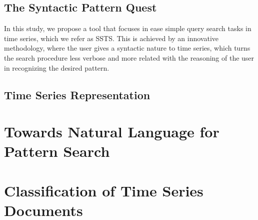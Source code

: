 \subsection{The Syntactic Pattern Quest}

In this study, we propose a tool that focuses in ease simple query search tasks in time series, which we refer as \gls{SSTS}. This is achieved by an innovative methodology, where the user gives a syntactic nature to time series, which turns the search procedure less verbose and more related with the reasoning of the user in recognizing the desired pattern.

\subsection{Time Series Representation}

\section{Towards Natural Language for Pattern Search}

\section{Classification of Time Series Documents}
